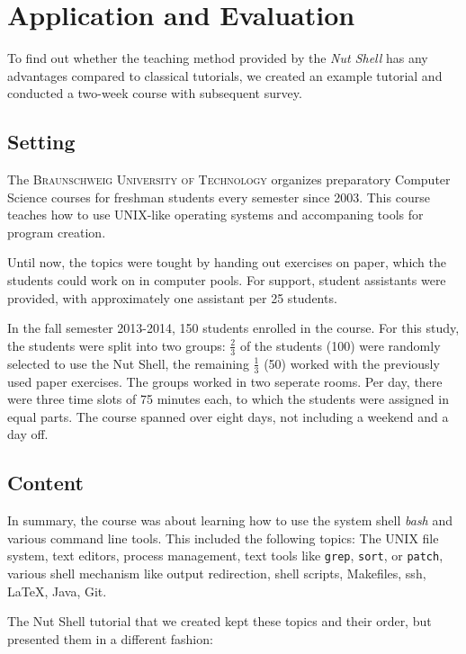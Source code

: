 \documentclass[paper=a4,abstract=on,cleardoublepage=empty,numbers=noenddot,toc=bib]{scrreprt}
\begin{document}
\chapter{Application and Evaluation}

To find out whether the teaching method provided by the \emph{Nut Shell} has any advantages compared to classical tutorials, we created an example tutorial and conducted a two-week course with subsequent survey.

\section{Setting}

The \textsc{Braunschweig University of Technology} organizes preparatory Computer Science courses for freshman students every semester since 2003. This course teaches how to use UNIX-like operating systems and accompaning tools for program creation.

Until now, the topics were tought by handing out exercises on paper, which the students could work on in computer pools. For support, student assistants were provided, with approximately one assistant per 25 students.

In the fall semester 2013-2014, 150 students enrolled in the course. For this study, the students were split into two groups: $\frac{2}{3}$ of the students (100) were randomly selected to use the Nut Shell, the remaining $\frac{1}{3}$ (50) worked with the previously used paper exercises. The groups worked in two seperate rooms. Per day, there were three time slots of 75 minutes each, to which the students were assigned in equal parts. The course spanned over eight days, not including a weekend and a day off.

\section{Content}

In summary, the course was about learning how to use the system shell \emph{bash} and various command line tools. This included the following topics: The UNIX file system, text editors, process management, text tools like \texttt{grep}, \texttt{sort}, or \texttt{patch}, various shell mechanism like output redirection, shell scripts, Makefiles, ssh, \LaTeX, Java, Git.

The Nut Shell tutorial that we created kept these topics and their order, but presented them in a different fashion: 
\end{document}
